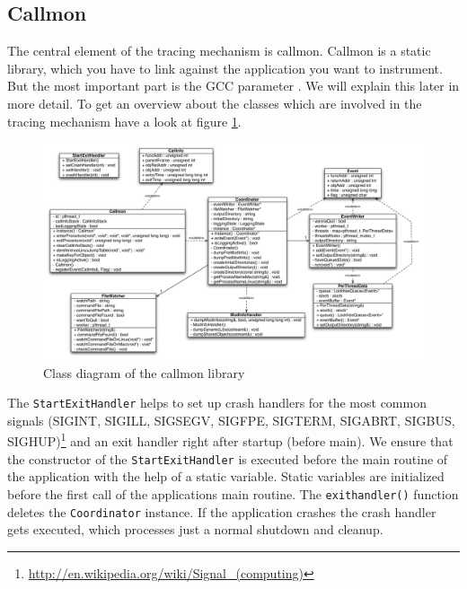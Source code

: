 \subsection{Callmon}

The central element of the tracing mechanism is callmon. Callmon is a static library, which you have to link against the application you want to instrument. But the most important part is the GCC parameter . We will explain this later in more detail. To get an overview about the classes which are involved in the tracing mechanism have a look at figure \ref{fig:UNIXfe_figure1}.

\begin{figure}[ht]
\centering
\includegraphics[width=16cm]{images/callmon_class_diagram}
\caption{Class diagram of the callmon library}\label{fig:UNIXfe_figure1}
\end{figure}

The \verb=StartExitHandler=  helps to set up crash handlers for the most common signals (SIGINT, SIGILL, SIGSEGV, SIGFPE, SIGTERM, SIGABRT, SIGBUS, SIGHUP)\footnote{\url{http://en.wikipedia.org/wiki/Signal_(computing)}} and an exit handler right after startup (before main). We ensure that the constructor of the \verb=StartExitHandler= is executed before the main routine of the application with the help of a static variable. Static variables are initialized before the first call of the applications main routine. The \verb=exithandler()= function deletes the \verb=Coordinator= instance. If the application crashes the crash handler gets executed, which processes just a normal shutdown and cleanup.

